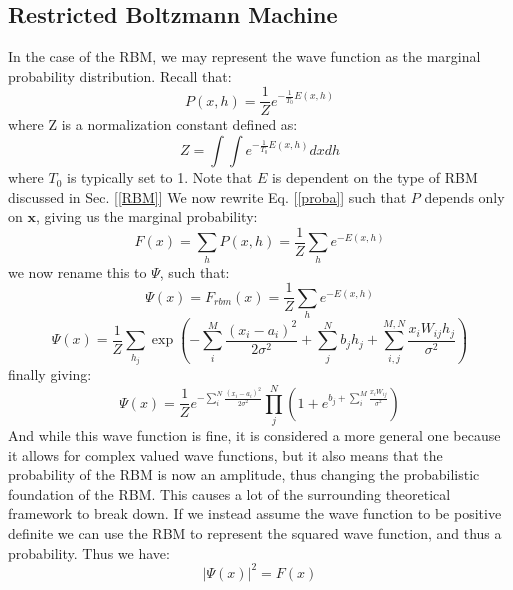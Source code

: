 \documentclass[12pt]{article}
\begin{document}
{\subsection{Restricted Boltzmann Machine}
In the case of the RBM, we may represent the wave function as the marginal probability distribution\cite{mhjorth-RBM}. \newline Recall that:
\begin{equation} \label{proba}
    P(x, h) = \frac{1}{Z} e^{- \frac{1}{T_0} E(x, h)}
\end{equation}
where Z is a normalization constant defined as:
\begin{equation} \label{part}
    Z = \int \int e^{- \frac{1}{T_0} E(x, h)} dxdh
\end{equation}
where $T_0$ is typically set to 1.
\newline Note that $E$ is dependent on the type of RBM discussed in Sec. [\ref{RBM}]
\newline We now rewrite Eq. [\ref{proba}] such that $P$ depends only on $\mathbf{x}$, giving us the marginal probability:
\begin{equation*}
    F(x) = \sum_h P(x, h) = \frac{1}{Z} \sum_h e^{-E(x, h)}
\end{equation*}
we now rename this to $\Psi$, such that:
\begin{equation*}
    \Psi(x) = F_{rbm}(x) = \frac{1}{Z} \sum_h e^{-E(x, h)}
\end{equation*} 
\begin{equation*}
    \Psi(x) = \frac{1}{Z} \sum_{h_j} \exp\left(-\sum_i^M \frac{(x_i-a_i)^2}{2\sigma^2} + \sum_j^N b_j h_j + \sum_{ i,j}^{M,N} \frac{x_i W_{ij} h_j}{\sigma^2} \right)
\end{equation*}
finally giving:
\begin{equation}
    \Psi(x) = \frac{1}{Z} e^{-\sum_i^N \frac{(x_i - a_i)^2}{2\sigma^2}} \prod_j^N \left(1 + e^{b_j + \sum_i^M \frac{x_i W_{ij}}{\sigma^2}} \right)
\end{equation}
And while this wave function is fine, it is considered a more general one because it allows for complex valued wave functions, but it also means that the probability of the RBM is now an amplitude, thus changing the probabilistic foundation of the RBM. This causes a lot of the surrounding theoretical framework to break down. If we instead assume the wave function to be positive definite we can use the RBM to represent the squared wave function, and thus a probability. Thus we have:
\begin{equation*}
    | \Psi(x)|^2 = F(x)

\end{equation*}}
\end{document}
